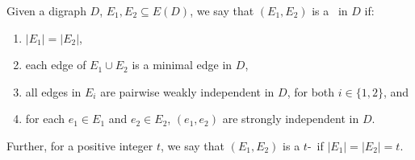 \begin{definition}[$t$-\toughpair]\label{def:ttough}
Given a digraph $D$, $E_1, E_2 \subseteq E(D)$, we say that $(E_1,E_2)$ is a \toughpair\  in $D$ if:
\begin{enumerate}
\item $|E_1| = |E_2|$,
\item each edge of $E_1 \cup E_2$ is a minimal edge in $D$,
\item all edges in $E_i$ are pairwise weakly independent in $D$, for both $i \in \{1,2\}$, and
\item for each $e_1 \in E_1$ and $e_2 \in E_2$, $(e_1,e_2)$ are strongly independent in $D$.
\end{enumerate}

Further, for a positive integer $t$, we say that $(E_1,E_2)$ is a $t$-\toughpair\ if $|E_1| = |E_2| =t$.
\end{definition}
